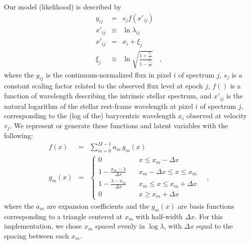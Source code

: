 \documentclass[12pt, letterpaper]{article}
\newcommand{\given}{\,|\,}
\newcommand{\normal}{{\mathcal{N}}}
\begin{document}
Our model (likelihood) is described by
\begin{eqnarray}
   y_{ij} &=& s_j f(x'_{ij})
  \\
  x'_{ij} &\equiv& \ln \lambda_{ij}
  \\
  x'_{ij} &=& x_i + \xi_j
  \\
  \xi_j &\equiv& \ln \sqrt{\frac{1 + \frac{v_j}{c}}{1 - \frac{v_j}{c}}}
  \quad , 
\end{eqnarray}
where the $y_{ij}$ is the continuum-normalized flux in pixel $i$ of
spectrum $j$, $s_j$ is a constant scaling factor related to the observed
flux level at epoch $j$, $f()$ is a function of
wavelength describing the intrinsic stellar spectrum, and
$x'_{ij}$ is the natural logarithm of the stellar rest-frame wavelength
at pixel $i$ of spectrum $j$, 
corresponding to the (log of the) barycentric wavelength $x_i$ observed at
velocity $v_j$.
We represent or generate these functions and latent variables
with the following:
\begin{eqnarray}
  f(x) &=& \sum_{m=0}^{M-1} a_m\,g_m(x)
  \\
  g_m(x) &=& \left\{
        \begin{array}{ll}
            0 & \quad x \leq x_m -\Delta x \\
            1 - \frac{x_m - \lambda}{\Delta x} & \quad x_m - \Delta x \leq x \leq x_m \\
            1 - \frac{\lambda - x_m}{\Delta x} & \quad x_m \leq x \leq x_m + \Delta x \\
            0 & \quad x \geq x_m + \Delta x \label{eqn:triangle}
        \end{array}
    \right.
  \quad ,
\end{eqnarray}
where the $a_m$ are expansion coefficients and the $g_m(x)$
are basis functions corresponding to a triangle centered at $x_m$ with half-width 
$\Delta x$. For this implementation, we chose $x_m$ spaced evenly in $\log \lambda$, 
with $\Delta x$ equal to the spacing between each $x_m$.
\end{document}

